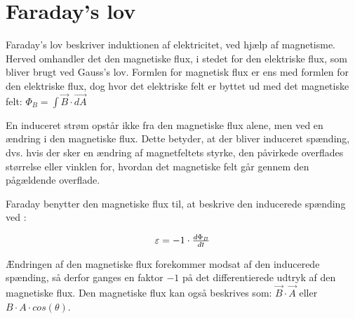 \section{Faraday's lov}

Faraday's lov beskriver induktionen af elektricitet, ved hjælp af magnetisme. Herved omhandler det den magnetiske flux, i stedet for den elektriske flux, som bliver brugt ved Gauss's lov. Formlen for magnetisk flux er ens med formlen for den elektriske flux, dog hvor det elektriske felt er byttet ud med det magnetiske felt: $\Phi_B = \int \vec{B} \cdot \vec{dA}$

En induceret strøm opstår ikke fra den magnetiske flux alene, men ved en ændring i den magnetiske flux. Dette betyder, at der bliver induceret spænding, dvs. hvis der sker en ændring af magnetfeltets styrke, den påvirkede overflades størrelse eller vinklen for, hvordan det magnetiske felt går gennem den pågældende overflade.

Faraday benytter den magnetiske flux til, at beskrive den inducerede spænding ved \cite{fysikbog}:

\begin{equation} \label{faraday}
\centerline{$\varepsilon = -1 \cdot \frac{d \Phi_B}{dt}$}
\end{equation}

Ændringen af den magnetiske flux forekommer modsat af den inducerede spænding, så derfor ganges en faktor $-1$ på det differentierede udtryk af den magnetiske flux. Den magnetiske flux kan også beskrives som: $\vec{B} \cdot \vec{A}$ eller $B \cdot A \cdot cos(\theta)$.
\newpage